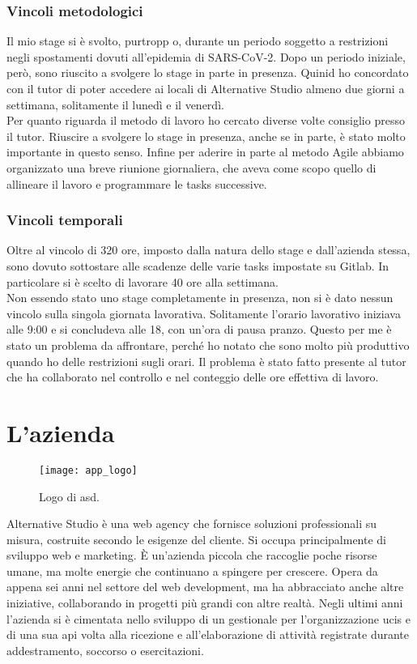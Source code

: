 \subsubsection{Vincoli metodologici}
Il mio stage si è svolto, purtropp o, durante un periodo soggetto a restrizioni negli spostamenti dovuti all'epidemia di SARS-CoV-2. Dopo un
periodo iniziale, però, sono riuscito a svolgere lo stage in parte in presenza. Quinid ho concordato con il tutor di poter accedere ai locali di
Alternative Studio almeno due giorni a settimana, solitamente il lunedì e il venerdì. \\
Per quanto riguarda il metodo di lavoro ho cercato diverse volte consiglio presso il tutor. Riuscire a svolgere lo stage in presenza, anche
se in parte, è stato molto importante in questo senso. Infine per aderire in parte al metodo \gls{Agile} abbiamo organizzato una breve riunione
giornaliera, che aveva come scopo quello di allineare il lavoro e programmare le tasks successive.

\subsubsection{Vincoli temporali}
Oltre al vincolo di 320 ore, imposto dalla natura dello stage e dall'azienda stessa, sono dovuto sottostare alle scadenze delle varie tasks
impostate su Gitlab. In particolare si è scelto di lavorare 40 ore alla settimana. \\
Non essendo stato  uno stage completamente in presenza, non si è dato nessun vincolo sulla singola giornata lavorativa. Solitamente l'orario
lavorativo iniziava alle 9:00 e si concludeva alle 18, con un'ora di pausa pranzo. Questo per me è stato un problema da affrontare, perché
ho notato che sono molto più produttivo quando ho delle restrizioni sugli orari. Il problema è stato fatto presente al tutor che ha
collaborato nel controllo e nel conteggio delle ore effettiva di lavoro.


\section{L'azienda}

\begin{figure}[htbp]
	\begin{center}
		\texttt{[image: app\_logo]}
	\end{center}
	\caption {Logo di \acrlong{asd}.}
\end{figure}

Alternative Studio è una web agency che fornisce soluzioni professionali su misura, costruite secondo le esigenze del cliente. Si occupa
principalmente di sviluppo web e marketing. È un'azienda piccola che raccoglie poche risorse umane, ma molte energie che continuano a
spingere per crescere. Opera da appena sei anni nel settore del web development, ma ha abbracciato anche altre iniziative, collaborando in
progetti più grandi con altre realtà. Negli ultimi anni l'azienda si è cimentata nello sviluppo di un gestionale per l'organizzazione
\gls{ucis} e di una sua \acrshort{api} volta alla ricezione e all'elaborazione di attività registrate durante addestramento,
soccorso o esercitazioni.

